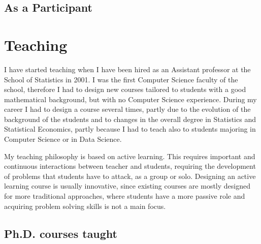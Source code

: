\documentclass[11pt,a4paper,roman]{moderncv}
\begin{document}
\subsection{As a Participant}





\section{Teaching}

I have started teaching when I have been hired as an Assistant professor at
  the School of Statistics in 2001.
  I was the first Computer Science faculty of the school, therefore I had to
  design new courses tailored to students with a good mathematical background,
  but with no Computer Science experience.
  During my career I had to design a course several times, partly due to the
  evolution of the background of the students and to changes in the overall
  degree in Statistics and Statistical Economics, partly because I had to teach
  also to students majoring in Computer Science or in Data Science.

  My teaching philosophy is based on active learning. This requires important
  and continuous interactions between teacher and students, requiring the
  development of problems that students have to attack, as a group or solo.
  Designing an active learning course is usually innovative, since existing
  courses are mostly designed for more traditional approaches, where students
  have a more passive role and acquiring problem solving skills is not a main focus.

  \subsection{Ph.D. courses taught}


\end{document}
